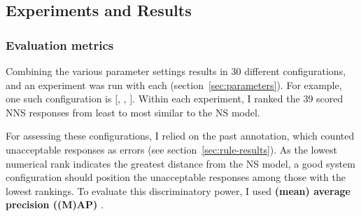 \subsection{Experiments and Results}
\label{sec:metrics}
\subsubsection{Evaluation metrics}

Combining the various parameter settings results in 30 different configurations, and an experiment was run with each (section~\ref{sec:parameters}). For example, one such configuration is $[$, , $]$.
Within each experiment, I ranked the 39 scored NNS responses from least to most similar to the NS model.

For assessing these configurations, I relied on the past annotation, which counted unacceptable responses as errors (see section~\ref{sec:rule-results}).  As the lowest numerical rank indicates the greatest distance from the NS model, a good system configuration should position the unacceptable responses among those with the lowest rankings.
To evaluate this discriminatory power, I used \textbf{(mean) average precision ((M)AP)}
\citep[][ch. 8]{manning-et-al:08}.

